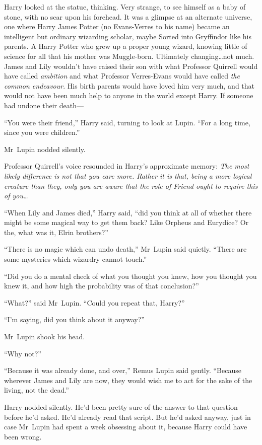 Harry looked at the statue, thinking. Very strange, to see himself as a baby of stone, with no scar upon his forehead. It was a glimpse at an alternate universe, one where Harry James Potter (no Evans-Verres to his name) became an intelligent but ordinary wizarding scholar, maybe Sorted into Gryffindor like his parents. A Harry Potter who grew up a proper young wizard, knowing little of science for all that his mother was Muggle-born. Ultimately changing…not much. James and Lily wouldn’t have raised their son with what Professor Quirrell would have called \emph{ambition} and what Professor Verres-Evans would have called \emph{the common endeavour}. His birth parents would have loved him very much, and that would not have been much help to anyone in the world except Harry. If someone had undone their death—

“You were their friend,” Harry said, turning to look at Lupin.
“For a long time, since you were children.”

Mr~Lupin nodded silently.

Professor Quirrell’s voice resounded in Harry’s approximate memory: \emph{The most likely difference is not that you care more. Rather it is that, being a more logical creature than they, only you are aware that the role of Friend ought to require this of you…}

“When Lily and James died,” Harry said, “did you think at all of whether there might be some magical way to get them back? Like Orpheus and Eurydice? Or the, what was it, Elrin brothers?”

“There is no magic which can undo death,” Mr~Lupin said quietly.
“There are some mysteries which wizardry cannot touch.”

“Did you do a mental check of what you thought you knew, how you thought you knew it, and how high the probability was of that conclusion?”

“What?” said Mr~Lupin.
“Could you repeat that, Harry?”

“I’m saying, did you think about it anyway?”

Mr~Lupin shook his head.

“Why not?”

“Because it was already done, and over,” Remus Lupin said gently.
“Because wherever James and Lily are now, they would wish me to act for the sake of the living, not the dead.”

Harry nodded silently. He’d been pretty sure of the answer to that question before he’d asked. He’d already read that script. But he’d asked anyway, just in case Mr~Lupin had spent a week obsessing about it, because Harry could have been wrong.

